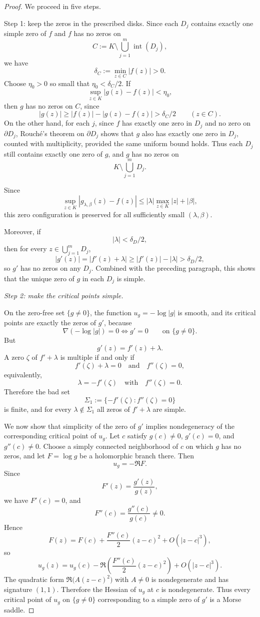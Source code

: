\documentclass[12pt]{amsart}
\theoremstyle{definition}
\theoremstyle{remark}
\begin{document}
\begin{proof} We proceed in five steps.

Step 1: keep the zeros in the prescribed disks. Since each \(D_j\) contains exactly one simple zero of
\(f\) and \(f\) has no zeros on
\[
C:=K\setminus \bigcup_{j=1}^m \operatorname{int}(D_j),
\]
we have
\[
\delta_C:=\min_{z\in C}|f(z)|>0.
\]
Choose \(\eta_0>0\) so small that \(\eta_0<\delta_C/2\). If
\[
\sup_{z\in K}|g(z)-f(z)|<\eta_0,
\]
then \(g\) has no zeros on \(C\), since
\[
|g(z)|\ge |f(z)|-|g(z)-f(z)|>\delta_C/2
\qquad (z\in C).
\]
On the other hand, for each \(j\), since \(f\) has exactly one zero in \(D_j\) and no zero on
\(\partial D_j\), Rouché's theorem on \(\partial D_j\) shows that \(g\) also has exactly one zero in
\(D_j\), counted with multiplicity, provided the same uniform bound holds. Thus each \(D_j\) still
contains exactly one zero of \(g\), and \(g\) has no zeros on
\[
K\setminus \bigcup_{j=1}^m D_j.
\]

Since
\[
\sup_{z\in K}|g_{\lambda,\beta}(z)-f(z)|
\le
|\lambda|\max_{z\in K}|z|+|\beta|,
\]
this zero configuration is preserved for all sufficiently small \((\lambda,\beta)\).

Moreover, if
\[
|\lambda|<\delta_D/2,
\]
then for every \(z\in \bigcup_{j=1}^m D_j\),
\[
|g'(z)|=|f'(z)+\lambda|\ge |f'(z)|-|\lambda|>\delta_D/2,
\]
so \(g'\) has no zeros on any \(D_j\). Combined with the preceding paragraph, this shows that the
unique zero of \(g\) in each \(D_j\) is simple.

\noindent\textit{Step 2: make the critical points simple.} 


On the zero-free set $\{g\neq 0\}$, the function $u_g=-\log|g|$ is smooth, and its critical points are exactly the zeros of $g'$, because
\[
\nabla(-\log|g|)=0 \iff g'=0
\qquad\text{on }\{g\neq 0\}.
\]
But
\[
g'(z)=f'(z)+\lambda.
\]
A zero $\zeta$ of $f'+\lambda$ is multiple if and only if
\[
f'(\zeta)+\lambda=0
\quad\text{and}\quad
f''(\zeta)=0,
\]
equivalently,
\[
\lambda=-f'(\zeta)
\quad\text{with}\quad
f''(\zeta)=0.
\]
Therefore the bad set
\[
\Sigma_1:=\{-f'(\zeta):f''(\zeta)=0\}
\]
is finite, and for every $\lambda\notin\Sigma_1$ all zeros of $f'+\lambda$ are simple.

We now show that simplicity of the zero of $g'$ implies nondegeneracy of the corresponding critical point of $u_g$. Let $c$ satisfy $g(c)\neq 0$, $g'(c)=0$, and $g''(c)\neq 0$. Choose a simply connected neighborhood of $c$ on which $g$ has no zeros, and let $F=\log g$ be a holomorphic branch there. Then
\[
u_g=-\Re F.
\]
Since
\[
F'(z)=\frac{g'(z)}{g(z)},
\]
we have $F'(c)=0$, and
\[
F''(c)=\frac{g''(c)}{g(c)}\neq 0.
\]
Hence
\[
F(z)=F(c)+\frac{F''(c)}{2}(z-c)^2+O(|z-c|^3),
\]
so
\[
u_g(z)
=
u_g(c)-\Re\!\left(\frac{F''(c)}{2}(z-c)^2\right)+O(|z-c|^3).
\]
The quadratic form $\Re\!\big(A(z-c)^2\big)$ with $A\neq 0$ is nondegenerate and has signature $(1,1)$. Therefore the Hessian of $u_g$ at $c$ is nondegenerate. Thus every critical point of $u_g$ on $\{g\neq 0\}$ corresponding to a simple zero of $g'$
is a Morse saddle.


\end{proof}
\end{document}
